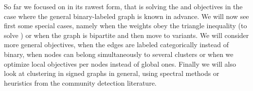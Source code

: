 
So far we focused on \pcc{} in its rawest form, that is solving the \mind{} and \maxa{} objectives
in the case where the general binary-labeled graph is known in advance. We will now see first some
special cases, namely when the weights obey the triangle inequality (to solve \msc{}) or when the
graph is bipartite and then move to variants. We will consider more general objectives, when the
edges are labeled categorically instead of binary, when nodes can belong simultaneously to several
clusters or when we optimize local objectives per nodes instead of global ones. Finally we will also look at
clustering in signed graphs in general, using spectral methods or heuristics from the community
detection literature.

